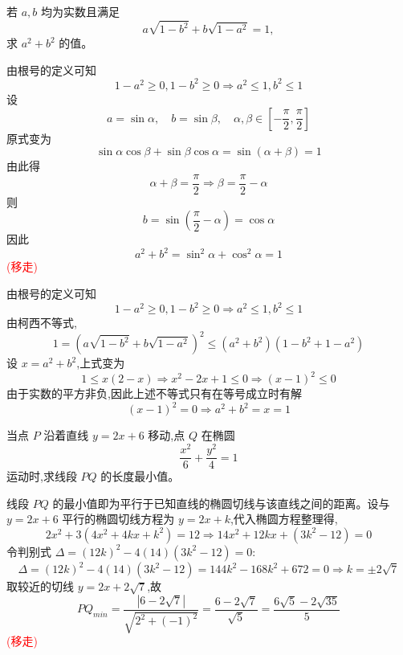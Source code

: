 \begin{questions}
\question 若 $a, b$ 均为实数且满足 
\[
a\sqrt{1-b^2} + b\sqrt{1-a^2} = 1,
\]
求 $a^2 + b^2$ 的值。
\begin{solution}
    由根号的定义可知 
    \[
    1-a^2 \ge 0,1-b^2 \ge 0 \Rightarrow a^2 \le 1, b^2 \le 1
    \]
    设 
    \[
    a = \sin \alpha,\quad b = \sin \beta, \quad \alpha, \beta \in \left[-\frac{\pi}{2}, \frac{\pi}{2}\right]
    \]
    原式变为
    \[
    \sin \alpha \cos \beta + \sin \beta \cos \alpha =\sin(\alpha + \beta) = 1
    \]
    由此得 
    \[
    \alpha + \beta = \frac{\pi}{2} \Rightarrow \beta = \frac{\pi}{2} - \alpha 
    \]
    则 
    \[
    b = \sin\left(\frac{\pi}{2} - \alpha\right) = \cos \alpha
    \]
    因此 
    \[
    a^2 + b^2 = \sin^2 \alpha + \cos^2 \alpha = 1
    \]
\textcolor{red}{(移走)}
\end{solution}
\begin{solution}
    由根号的定义可知 
    \[
    1-a^2 \ge 0,1-b^2 \ge 0 \Rightarrow a^2 \le 1, b^2 \le 1
    \]
    由柯西不等式,
    \[
    1=\left( a\sqrt{1-b^2} + b\sqrt{1-a^2} \right)^2 \le (a^2 + b^2)(1-b^2+1-a^2)
    \]
    设 $x = a^2 + b^2$,上式变为
    \[
    1 \le x(2 - x) \Rightarrow x^2 - 2x + 1 \le 0 \Rightarrow (x - 1)^2 \le 0
    \]
    由于实数的平方非负,因此上述不等式只有在等号成立时有解
    \[
    (x - 1)^2 = 0 \Rightarrow a^2 + b^2 = x = 1
    \]
\end{solution}

\question 当点 $P$ 沿着直线 $y = 2x + 6$ 移动,点 $Q$ 在椭圆 
\[
\dfrac{x^2}{6} + \dfrac{y^2}{4} = 1
\] 
运动时,求线段 $PQ$ 的长度最小值。
\begin{solution}
线段 $PQ$ 的最小值即为平行于已知直线的椭圆切线与该直线之间的距离。设与 $y = 2x + 6$ 平行的椭圆切线方程为 $y = 2x + k$,代入椭圆方程整理得,
\[
2x^2 + 3(4x^2 + 4kx + k^2) = 12 \Rightarrow 14x^2 + 12kx + (3k^2 - 12) = 0
\]
令判别式 $\Delta = (12k)^2 - 4(14)(3k^2 - 12) = 0$:
\[
\Delta = (12k)^2 - 4(14)(3k^2 - 12) = 144k^2 - 168k^2 + 672 = 0 \Rightarrow k = \pm 2\sqrt{7}
\]
取较近的切线 $y = 2x + 2\sqrt{7}$,故
\[
PQ_{min} = \frac{|6 - 2\sqrt{7}|}{\sqrt{2^2 + (-1)^2}} = \frac{6 - 2\sqrt{7}}{\sqrt{5}} = \frac{6\sqrt{5} - 2\sqrt{35}}{5}
\]
\textcolor{red}{(移走)}
\end{solution}


\end{questions}

